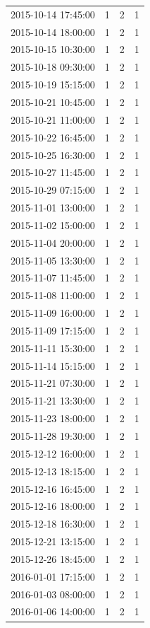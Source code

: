 \begin{tabular}{lrrr}
2015-10-14 17:45:00 & 1 & 2 & 1 \\
2015-10-14 18:00:00 & 1 & 2 & 1 \\
2015-10-15 10:30:00 & 1 & 2 & 1 \\
2015-10-18 09:30:00 & 1 & 2 & 1 \\
2015-10-19 15:15:00 & 1 & 2 & 1 \\
2015-10-21 10:45:00 & 1 & 2 & 1 \\
2015-10-21 11:00:00 & 1 & 2 & 1 \\
2015-10-22 16:45:00 & 1 & 2 & 1 \\
2015-10-25 16:30:00 & 1 & 2 & 1 \\
2015-10-27 11:45:00 & 1 & 2 & 1 \\
2015-10-29 07:15:00 & 1 & 2 & 1 \\
2015-11-01 13:00:00 & 1 & 2 & 1 \\
2015-11-02 15:00:00 & 1 & 2 & 1 \\
2015-11-04 20:00:00 & 1 & 2 & 1 \\
2015-11-05 13:30:00 & 1 & 2 & 1 \\
2015-11-07 11:45:00 & 1 & 2 & 1 \\
2015-11-08 11:00:00 & 1 & 2 & 1 \\
2015-11-09 16:00:00 & 1 & 2 & 1 \\
2015-11-09 17:15:00 & 1 & 2 & 1 \\
2015-11-11 15:30:00 & 1 & 2 & 1 \\
2015-11-14 15:15:00 & 1 & 2 & 1 \\
2015-11-21 07:30:00 & 1 & 2 & 1 \\
2015-11-21 13:30:00 & 1 & 2 & 1 \\
2015-11-23 18:00:00 & 1 & 2 & 1 \\
2015-11-28 19:30:00 & 1 & 2 & 1 \\
2015-12-12 16:00:00 & 1 & 2 & 1 \\
2015-12-13 18:15:00 & 1 & 2 & 1 \\
2015-12-16 16:45:00 & 1 & 2 & 1 \\
2015-12-16 18:00:00 & 1 & 2 & 1 \\
2015-12-18 16:30:00 & 1 & 2 & 1 \\
2015-12-21 13:15:00 & 1 & 2 & 1 \\
2015-12-26 18:45:00 & 1 & 2 & 1 \\
2016-01-01 17:15:00 & 1 & 2 & 1 \\
2016-01-03 08:00:00 & 1 & 2 & 1 \\
2016-01-06 14:00:00 & 1 & 2 & 1 \\

\end{tabular}
